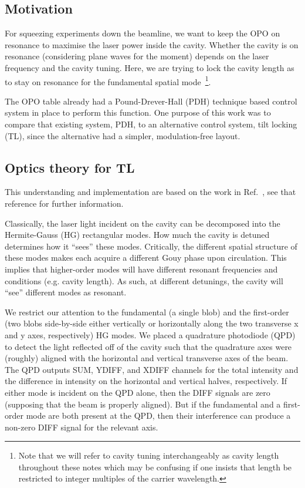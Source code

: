 \documentclass[aps,pra,superscriptaddress,reprint,nofootinbib]{revtex4-1}
\begin{document}
\subsection{Motivation}

For squeezing experiments down the beamline, we want to keep the OPO on resonance to maximise the laser power inside the cavity. Whether the cavity is on resonance (considering plane waves for the moment) depends on the laser frequency and the cavity tuning. Here, we are trying to lock the cavity length as to stay on resonance for the fundamental spatial mode~\footnote{Note that we will refer to cavity tuning interchangeably as cavity length throughout these notes which may be confusing if one insists that length be restricted to integer multiples of the carrier wavelength.}.


The OPO table already had a Pound-Drever-Hall (PDH) technique based control system in place to perform this function. One purpose of this work was to compare that existing system, PDH, to an alternative control system, tilt locking (TL), since the alternative had a simpler, modulation-free layout.


\subsection{Optics theory for TL}

This understanding and implementation are based on the work in Ref.~\cite{TL:1999}, see that reference for further information.


Classically, the laser light incident on the cavity can be decomposed into the Hermite-Gauss (HG) rectangular modes. How much the cavity is detuned determines how it ``sees'' these modes. Critically, the different spatial structure of these modes makes each acquire a different Gouy phase upon circulation. This implies that higher-order modes will have different resonant frequencies and conditions (e.g. cavity length). As such, at different detunings, the cavity will ``see'' different modes as resonant.


We restrict our attention to the fundamental (a single blob) and the first-order (two blobs side-by-side either vertically or horizontally along the two transverse x and y axes, respectively) HG modes. We placed a quadrature photodiode (QPD) to detect the light reflected off of the cavity such that the quadrature axes were (roughly) aligned with the horizontal and vertical transverse axes of the beam. The QPD outputs SUM, YDIFF, and XDIFF channels for the total intensity and the difference in intensity on the horizontal and vertical halves, respectively. If either mode is incident on the QPD alone, then the DIFF signals are zero (supposing that the beam is properly aligned). But if the fundamental and a first-order mode are both present at the QPD, then their interference can produce a non-zero DIFF signal for the relevant axis.
\end{document}
